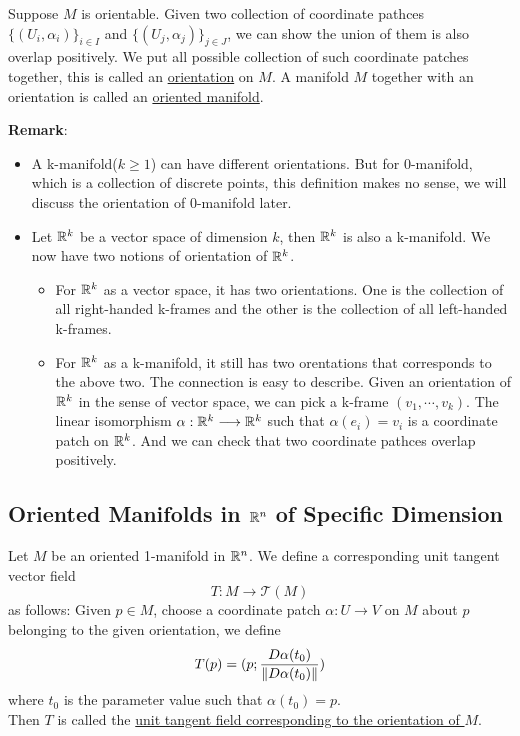 \begin{definition}
    Suppose $M$ is orientable. Given two collection of coordinate pathces $\{(U_i,\alpha_i)\}_{i\in I}$ and $\{(U_j,\alpha_j)\}_{j\in J}$, we can show the union of them is also overlap positively. 
    We put all possible collection of such coordinate patches together, this is called an \underline{orientation} on $M$. 
    A manifold $M$ together with an orientation is called an \underline{oriented manifold}.
\end{definition}
\noindent\textbf{Remark}:
\begin{itemize}
    \item A k-manifold($k\geq1$) can have different orientations. But for 0-manifold, which is a collection of discrete points, this definition makes no sense, we will discuss the orientation of 0-manifold later.
    \item Let $\mathbb{R}^k$ be a vector space of dimension $k$, then $\mathbb{R}^k$ is also a k-manifold. We now have two notions of orientation of $\mathbb{R}^k$. 
    \begin{itemize}
        \item For $\mathbb{R}^k$ as a vector space, it has two orientations. One is the collection of all right-handed k-frames and the other is the collection of all left-handed k-frames.
        \item For $\mathbb{R}^k$ as a k-manifold, it still has two orentations that corresponds to the above two. The connection is easy to describe. Given an orientation of $\mathbb{R}^k$ in the sense of vector space, we can pick a k-frame $(v_1,\cdots,v_k)$. The linear isomorphism $\alpha:\mathbb{R}^k\longrightarrow\mathbb{R}^k$ such that $\alpha(e_i)=v_i$ is a coordinate patch on $\mathbb{R}^k$. And we can check that two coordinate pathces overlap positively.
    \end{itemize}
\end{itemize}

\subsection{Oriented Manifolds in $\mathbb{R}^n$ of Specific Dimension}

\begin{definition}
    Let $M$ be an oriented 1-manifold in $\mathbb{R}^n$. We define a corresponding unit tangent vector field $$T:M\longrightarrow\mathcal{T}(M)$$
    as follows: Given $p\in M$, choose a coordinate patch $\alpha:U\longrightarrow V$ on $M$ about $p$ belonging to the given orientation, we define $$T(p)=(p;\frac{D\alpha(t_0)}{\left\lVert D\alpha(t_0) \right\rVert})$$
    where $t_0$ is the parameter value such that $\alpha(t_0)=p$.\\
    Then $T$ is called the \underline{unit tangent field corresponding to the orientation of $M$}.
\end{definition}

